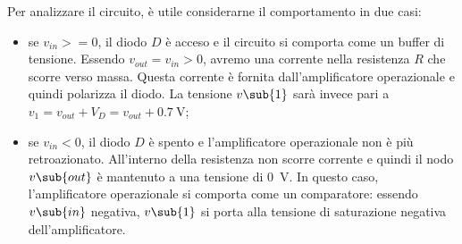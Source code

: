 Per analizzare il circuito, è utile considerarne il comportamento in due casi:
\begin{itemize}
	\item se $v_{in}>=0$, il diodo $D$ è acceso e il circuito si comporta come un buffer di tensione. Essendo $v_{out}=v_{in}>0$, avremo una corrente nella resistenza $R$ che scorre verso massa. Questa corrente è fornita dall'amplificatore operazionale e quindi polarizza il diodo. La tensione $v\sub{1}$ sarà invece pari a $v_1=v_{out}+V_D=v_{out}+\SI{0.7}{\volt}$;
	\item se $v_{in}<0$, il diodo $D$ è spento e l'amplificatore operazionale non è più retroazionato. All'interno della resistenza non scorre corrente e quindi il nodo $v\sub{out}$ è mantenuto a una tensione di \SI{0}{\volt}. In questo caso, l'amplificatore operazionale si comporta come un comparatore: essendo $v\sub{in}$ negativa, $v\sub{1}$ si porta alla tensione di saturazione negativa dell'amplificatore.
\end{itemize}

